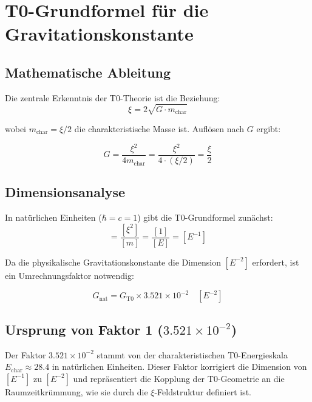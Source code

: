 	\section{T0-Grundformel für die Gravitationskonstante}
	
	\subsection{Mathematische Ableitung}
	
	Die zentrale Erkenntnis der T0-Theorie ist die Beziehung:
	\begin{equation}
		\xi = 2\sqrt{G \cdot m_{\text{char}}}
	\end{equation}
	
	wobei $m_{\text{char}} = \xi/2$ die charakteristische Masse ist. Auflösen nach $G$ ergibt:
	
	\begin{equation}
		\boxed{G = \frac{\xi^2}{4m_{\text{char}}} = \frac{\xi^2}{4 \cdot (\xi/2)} = \frac{\xi}{2}}
	\end{equation}
	
	\subsection{Dimensionsanalyse}
	
	In natürlichen Einheiten ($\hbar = c = 1$) gibt die T0-Grundformel zunächst:
	\begin{equation}
		[G_{\text{T0}}] = \frac{[\xi^2]}{[m]} = \frac{[1]}{[E]} = [E^{-1}]
	\end{equation}
	
	Da die physikalische Gravitationskonstante die Dimension $[E^{-2}]$ erfordert, ist ein Umrechnungsfaktor notwendig:
	
	\begin{equation}
		G_{\text{nat}} = G_{\text{T0}} \times 3.521 \times 10^{-2} \quad [E^{-2}]
	\end{equation}
	
	\subsection{Ursprung von Faktor 1 ($3.521 \times 10^{-2}$)}
	
	Der Faktor $3.521 \times 10^{-2}$ stammt von der charakteristischen T0-Energieskala $E_{\text{char}} \approx 28.4$ in natürlichen Einheiten. Dieser Faktor korrigiert die Dimension von $[E^{-1}]$ zu $[E^{-2}]$ und repräsentiert die Kopplung der T0-Geometrie an die Raumzeitkrümmung, wie sie durch die $\xi$-Feldstruktur definiert ist.
	
